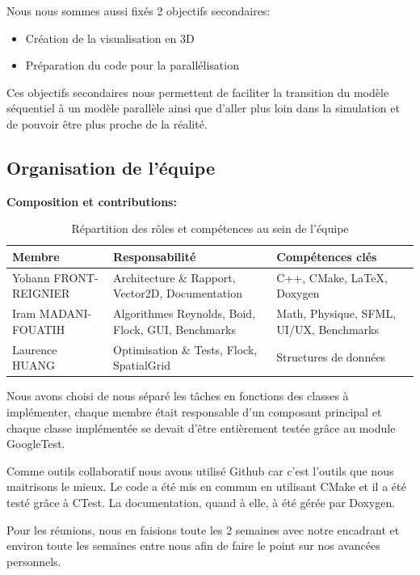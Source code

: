 \documentclass[11pt,a4paper]{article}
\begin{document}
Nous nous sommes aussi fixés 2 objectifs secondaires:
\begin{itemize}
    \item Création de la visualisation en 3D
    \item Préparation du code pour la parallélisation
\end{itemize}
Ces objectifs secondaires nous permettent de faciliter la transition du modèle séquentiel à un modèle parallèle ainsi que d'aller plus loin dans la simulation et de pouvoir être plus proche de la réalité.

\subsection{Organisation de l'équipe}
\textbf{Composition et contributions:}
\begin{table}[h]
    \centering
    \begin{tabular}{|p{4cm}|p{5cm}|p{4cm}|}
        \hline
        \textbf{Membre} & \textbf{Responsabilité} & \textbf{Compétences clés} \\
        \hline
        Yohann FRONT-REIGNIER & 
        Architecture \& Rapport, Vector2D, Documentation & C++, CMake, LaTeX, Doxygen \\
        \hline
        Iram MADANI-FOUATIH & 
        Algorithmes Reynolds, Boid, Flock, GUI, Benchmarks &
        Math, Physique, SFML, UI/UX, Benchmarks\\
        \hline
        Laurence HUANG &
        Optimisation \& Tests, Flock, SpatialGrid &
        Structures de données\\
        \hline
    \end{tabular}
    \caption{Répartition des rôles et compétences au sein de l'équipe}
    \label{tab:organisation}
\end{table}


Nous avons choisi de nous séparé les tâches en fonctions des classes à implémenter, chaque membre était responsable d'un composant principal et chaque classe implémentée se devait d'être entièrement testée grâce au module GoogleTest.

Comme outils collaboratif nous avons utilisé Github car c'est l'outils que nous maitrisons le mieux. Le code a été mis en commun en utilisant CMake et il a été testé grâce à CTest. La documentation, quand à elle, à été gérée par Doxygen.

Pour les réunions, nous en faisions toute les 2 semaines avec notre encadrant et environ toute les semaines entre nous afin de faire le point sur nos avancées personnels.
\end{document}
